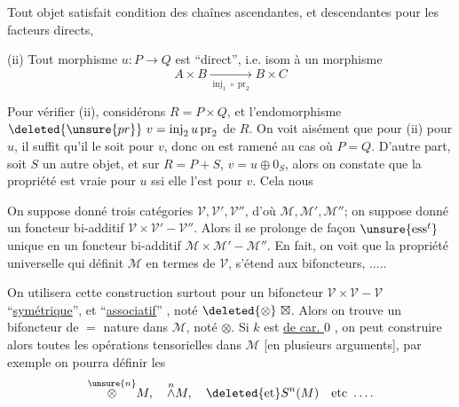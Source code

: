  Tout objet  satisfait condition des chaînes ascendantes,
et descendantes pour les  facteurs directs,

(ii) Tout morphisme \(u:P\longrightarrow Q\) est ``direct'',
i.e. isom à un morphisme
\[
A\times B\xrightarrow[\operatorname{inj}_1\circ\operatorname{pr}_2]{}B\times C
\]

Pour vérifier (ii),  considérons \(R=P\times Q\),
et l'endomorphisme \(\deleted{\unsure{pr}}\ v=\operatorname{inj}_2u\operatorname{pr}_2\) de \(R\).
On voit aisément que pour  (ii) 
pour \(u\),
il \inserted{\(^{(*)}\)} suffit  qu'il le soit pour \(v\), donc on
est ramené au cas où \(P=Q\). D'autre part,
soit  \(S\) un autre objet, et sur
\(R=P+S\), \(v=u\oplus0_S\), alors on constate que la
propriété est vraie pour \(u\) ssi elle l'est pour \(v\). Cela nous


On suppose donné trois catégories 
\(\mathcal V,\mathcal V',\mathcal V''\),
d'où \(\mathcal M,\mathcal M',\mathcal M''\); on suppose donné un
foncteur bi-additif \(\mathcal V\times\mathcal V'\mathbin{-}\mathcal V''\).
Alors il se
prolonge de façon \(\unsure{\mathrm{ess}^{t}}\) unique en un
foncteur bi-additif \(\mathcal M\times\mathcal M'\mathbin{-}\mathcal M''\).
En fait,
on voit que la propriété universelle qui
définit \(\mathcal M\) en termes de \(\mathcal V\), s'étend aux
bifoncteurs, .....

On  utilisera cette construction surtout
pour un bifoncteur \(\mathcal V\times\mathcal V\mathbin{-}\mathcal V\)
``\uline{symétrique}'', et ``\uline{associatif}''
, noté \(\deleted{\otimes}\ \boxtimes\).
Alors
on trouve un bifoncteur de \(=\) nature dans
\(\mathcal M\), noté \(\otimes\). Si \(k\) est \uline{de car. \(0\)}
, on peut
construire alors toutes les opérations tensorielles 
dans \(\mathcal M\) [en plusieurs arguments], par
exemple on pourra définir les
\[
\overset{\unsure{n}}{\otimes}M,\quad
\overset{n}{\wedge}M,\quad
\deleted{\text{et}} S^n(M)\quad\text{etc}\ \ldots.
\]
